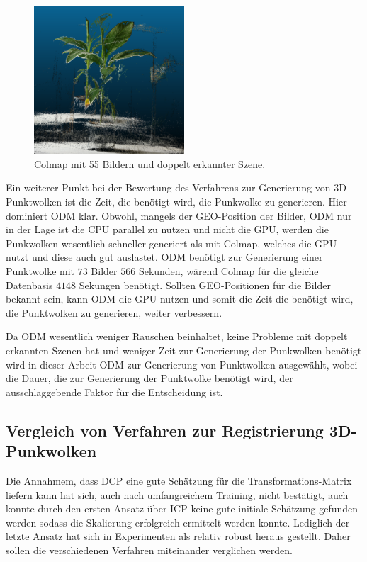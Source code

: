 \documentclass[12pt,titlepage, twoside]{article}
\begin{document}
\begin{figure}
    \centering
        \includegraphics[width=0.5\textwidth]{./Images/ColmapDuplicatedScene.png}
        \caption{Colmap mit 55 Bildern und doppelt erkannter Szene.}
        \label{fig:ColmapDuplicatedScene}
\end{figure}

Ein weiterer Punkt bei der Bewertung des Verfahrens zur Generierung von 3D Punktwolken ist die Zeit, die benötigt wird, die Punkwolke zu generieren.
Hier dominiert ODM klar. 
Obwohl, mangels der GEO-Position der Bilder, ODM nur in der Lage ist die CPU parallel zu nutzen und nicht die GPU, werden die Punkwolken wesentlich schneller generiert als mit Colmap, welches die GPU nutzt und diese auch gut auslastet.
ODM benötigt zur Generierung einer Punktwolke mit $73$ Bilder $566$ Sekunden, wärend Colmap für die gleiche Datenbasis $4148$ Sekungen benötigt. 
Sollten GEO-Positionen für die Bilder bekannt sein, kann ODM die GPU nutzen und somit die Zeit die benötigt wird, die Punktwolken zu generieren, weiter verbessern.

Da ODM wesentlich weniger Rauschen beinhaltet, keine Probleme mit doppelt erkannten Szenen hat und weniger Zeit zur Generierung der Punkwolken benötigt wird in dieser Arbeit ODM zur Generierung von Punktwolken ausgewählt, 
wobei die Dauer, die zur Generierung der Punktwolke benötigt wird, der ausschlaggebende Faktor für die Entscheidung ist.

\subsection{Vergleich von Verfahren zur Registrierung 3D-Punkwolken}

Die Annahmem, dass DCP eine gute Schätzung für die Transformations-Matrix liefern kann hat sich, auch nach umfangreichem Training, nicht bestätigt, 
auch konnte durch den ersten Ansatz über ICP keine gute initiale Schätzung gefunden werden sodass die Skalierung erfolgreich ermittelt werden konnte.
Lediglich der letzte Ansatz hat sich in Experimenten als relativ robust heraus gestellt. Daher sollen die verschiedenen Verfahren miteinander verglichen werden.
\end{document}
